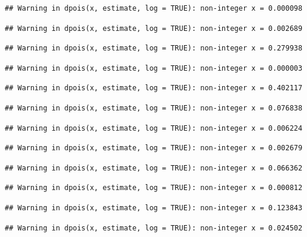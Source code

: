 \documentclass[]{article}
\begin{document}
\begin{verbatim}
## Warning in dpois(x, estimate, log = TRUE): non-integer x = 0.000098
\end{verbatim}

\begin{verbatim}
## Warning in dpois(x, estimate, log = TRUE): non-integer x = 0.002689
\end{verbatim}

\begin{verbatim}
## Warning in dpois(x, estimate, log = TRUE): non-integer x = 0.279938
\end{verbatim}

\begin{verbatim}
## Warning in dpois(x, estimate, log = TRUE): non-integer x = 0.000003
\end{verbatim}

\begin{verbatim}
## Warning in dpois(x, estimate, log = TRUE): non-integer x = 0.402117
\end{verbatim}

\begin{verbatim}
## Warning in dpois(x, estimate, log = TRUE): non-integer x = 0.076838
\end{verbatim}

\begin{verbatim}
## Warning in dpois(x, estimate, log = TRUE): non-integer x = 0.006224
\end{verbatim}

\begin{verbatim}
## Warning in dpois(x, estimate, log = TRUE): non-integer x = 0.002679
\end{verbatim}

\begin{verbatim}
## Warning in dpois(x, estimate, log = TRUE): non-integer x = 0.066362
\end{verbatim}

\begin{verbatim}
## Warning in dpois(x, estimate, log = TRUE): non-integer x = 0.000812
\end{verbatim}

\begin{verbatim}
## Warning in dpois(x, estimate, log = TRUE): non-integer x = 0.123843
\end{verbatim}

\begin{verbatim}
## Warning in dpois(x, estimate, log = TRUE): non-integer x = 0.024502
\end{verbatim}
\end{document}
